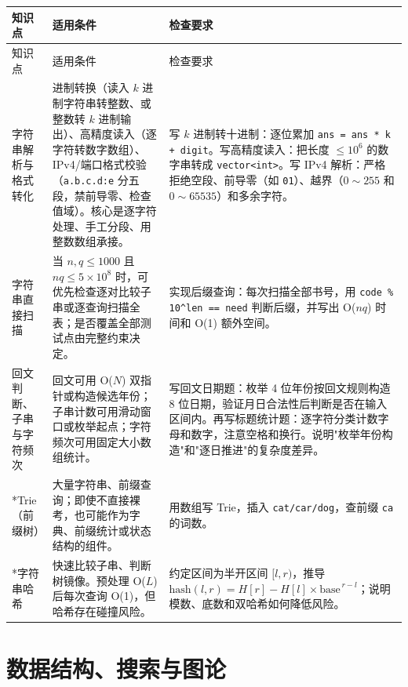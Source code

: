 \documentclass[a4paper,11pt]{article}
\newcommand{\code}[1]{\texttt{#1}}
\begin{document}
\begin{longtable}{L{2.4cm} L{7.5cm} L{6.8cm}}
\toprule
知识点 & 适用条件 & 检查要求 \\
\midrule
\endfirsthead
\toprule
知识点 & 适用条件 & 检查要求 \\
\midrule
\endhead
\endfoot
\bottomrule
\endlastfoot

字符串解析与格式转化
& 进制转换（读入 $k$ 进制字符串转整数、或整数转 $k$ 进制输出）、高精度读入（逐字符转数字数组）、IPv4/端口格式校验（\code{a.b.c.d:e} 分五段，禁前导零、检查值域）。核心是逐字符处理、手工分段、用整数数组承接。
& 写 $k$ 进制转十进制：逐位累加 \code{ans = ans * k + digit}。写高精度读入：把长度 $\le10^6$ 的数字串转成 \code{vector<int>}。写 IPv4 解析：严格拒绝空段、前导零（如 \code{01}）、越界（$0\sim255$ 和 $0\sim65535$）和多余字符。 \\[2mm]

字符串直接扫描
& 当 $n,q\le1000$ 且 $nq\le5\times10^8$ 时，可优先检查逐对比较子串或逐查询扫描全表；是否覆盖全部测试点由完整约束决定。
& 实现后缀查询：每次扫描全部书号，用 \code{code \% 10\^{}len == need} 判断后缀，并写出 O($nq$) 时间和 O(1) 额外空间。 \\[2mm]

回文判断、子串与字符频次
& 回文可用 O($N$) 双指针或构造候选年份；子串计数可用滑动窗口或枚举起点；字符频次可用固定大小数组统计。
& 写回文日期题：枚举 4 位年份按回文规则构造 8 位日期，验证月日合法性后判断是否在输入区间内。再写标题统计题：逐字符分类计数字母和数字，注意空格和换行。说明"枚举年份构造"和"逐日推进"的复杂度差异。 \\[2mm]

*Trie（前缀树）
& 大量字符串、前缀查询；即使不直接裸考，也可能作为字典、前缀统计或状态结构的组件。
& 用数组写 Trie，插入 \code{cat/car/dog}，查前缀 \code{ca} 的词数。 \\[2mm]

*字符串哈希
& 快速比较子串、判断树镜像。预处理 O($L$) 后每次查询 O(1)，但哈希存在碰撞风险。
& 约定区间为半开区间 $[l,r)$，推导 $\text{hash}(l,r)=H[r]-H[l]\times\text{base}^{\,r-l}$；说明模数、底数和双哈希如何降低风险。 \\
\end{longtable}

\newpage
\section{数据结构、搜索与图论}
\end{document}
